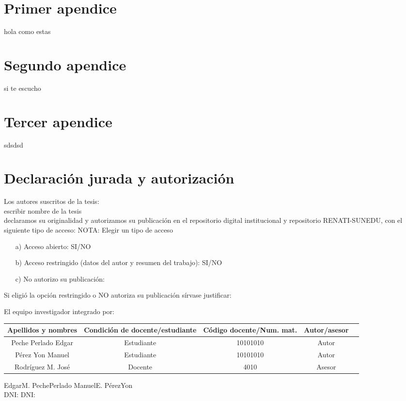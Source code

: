 
\appendix
\chapter{Primer apendice}
hola como estas
\chapter{Segundo apendice}
si te escucho
\chapter{Tercer apendice}
sdsdsd


\chapter*{\hspace*{1cm} Declaración jurada y autorización}

Los autores suscritos de la tesis: \\ 
{\small escribir nombre de la tesis} \\
declaramos su originalidad y autorizamos su publicación en el repositorio digital institucional y repositorio RENATI-SUNEDU, con el siguiente tipo de acceso: NOTA: Elegir un tipo de acceso

\begin{enumerate}
\item[a)] Acceso abierto: SI/NO
\item[b)] Acceso restringido (datos del autor y resumen del trabajo): SI/NO
\item[c)] No autorizo su publicación: 
\end{enumerate}
Si eligió la opción restringido  o NO autoriza su publicación sírvase justificar: 

El equipo investigador integrado por: \\
\hspace{-0.5cm}
\begin{tabular}{|c|c|c|c|c|}
\hline 
Apellidos y nombres & Condición de docente/estudiante & Código docente/Num. mat. & Autor/asesor \\ \hline 
Peche Perlado Edgar & Estudiante & 10101010 & Autor  \\ \hline 
Pérez Yon Manuel & Estudiante & 10101010 & Autor  \\ \hline 
Rodríguez M. José & Docente & 4010 & Asesor  \\ \hline 
\end{tabular} 
\vskip 1.2cm
\hspace{0.7cm}Edgar\hspace{.1cm}M.\hspace{.1cm} Peche\hspace{.1cm}Perlado 
\hspace{4cm}Manuel\hspace{.1cm}E.\hspace{.1cm} Pérez\hspace{.1cm}Yon \\
\hspace*{2.6cm} DNI:  \hspace*{6.6cm}DNI:


